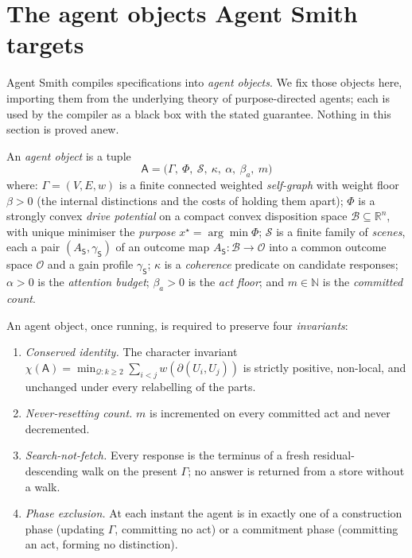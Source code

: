 \documentclass[11pt,twocolumn,a4paper]{article}
\newcommand{\R}{\mathbb{R}}
\newcommand{\N}{\mathbb{N}}
\newcommand{\Agent}{\mathsf{A}}
\newcommand{\Self}{\Gamma}
\newcommand{\V}{V}
\newcommand{\E}{E}
\newcommand{\wt}{w}
\newcommand{\floorc}{\beta}
\newcommand{\cut}{\partial}
\newcommand{\Char}{\chi}
\newcommand{\drive}{\Phi}
\newcommand{\Purp}{x^{\star}}
\newcommand{\att}{\alpha}
\newcommand{\Scene}{\mathsf{S}}
\newcommand{\scenes}{\mathcal{S}}
\newcommand{\Out}{\mathcal{O}}
\newcommand{\coh}{\kappa}              %
\begin{document}
\section{The agent objects Agent Smith targets}
\label{sec:objects}

Agent Smith compiles specifications into \emph{agent objects}. We fix those
objects here, importing them from the underlying theory of purpose-directed
agents; each is used by the compiler as a black box with the stated
guarantee. Nothing in this section is proved anew.

\begin{definition}
\label{def:agent-object}
An \emph{agent object} is a tuple
\[
\Agent=\bigl(\Self,\ \drive,\ \scenes,\ \coh,\ \att,\ \floorc_a,\ m\bigr)
\]
where: $\Self=(\V,\E,\wt)$ is a finite connected weighted \emph{self-graph}
with weight floor $\floorc>0$ (the internal distinctions and the costs of
holding them apart); $\drive$ is a strongly convex \emph{drive potential} on
a compact convex disposition space $\mathcal{B}\subseteq\R^n$, with unique
minimiser the \emph{purpose} $\Purp=\arg\min\drive$; $\scenes$ is a finite
family of \emph{scenes}, each a pair $(A_\Scene,\gamma_\Scene)$ of an outcome
map $A_\Scene:\mathcal{B}\to\Out$ into a common outcome space $\Out$ and a
gain profile $\gamma_\Scene$; $\coh$ is a \emph{coherence} predicate on
candidate responses; $\att>0$ is the \emph{attention budget}; $\floorc_a>0$
is the \emph{act floor}; and $m\in\N$ is the \emph{committed count}.
\end{definition}

\begin{definition}
\label{def:invariants}
An agent object, once running, is required to preserve four
\emph{invariants}:
\begin{enumerate}[label=\textbf{(I\arabic*)},leftmargin=3em]
\item \emph{Conserved identity.} The character invariant
$\Char(\Agent)=\min_{\mathcal{Q}:k\ge2}\sum_{i<j}\wt(\cut(U_i,U_j))$ is
strictly positive, non-local, and unchanged under every relabelling of the
parts.
\item \emph{Never-resetting count.} $m$ is incremented on every committed act
and never decremented.
\item \emph{Search-not-fetch.} Every response is the terminus of a fresh
residual-descending walk on the present $\Self$; no answer is returned from a
store without a walk.
\item \emph{Phase exclusion.} At each instant the agent is in exactly one of a
construction phase (updating $\Self$, committing no act) or a commitment phase
(committing an act, forming no distinction).
\end{enumerate}
\end{definition}
\end{document}
